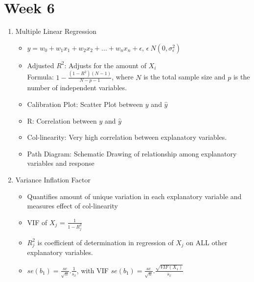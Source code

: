 \documentclass[a4paper]{article}
\begin{document}
 \section{Week 6}
 \begin{enumerate}
     \item Multiple Linear Regression
     \begin{itemize}
         \item $y = w_0 + w_1x_1 + w_2x_2 + ... + w_nx_n + \epsilon$, $\epsilon ~ N(0,\sigma_\epsilon^2)$
         \item Adjusted $R^2$: Adjusts for the amount of $X_i$\\
         Formula: $1 - \frac{(1 - R^2)(N - 1)}{N - p - 1}$, where $N$ is the total sample size and $p$ is the number of independent variables.
         \item Calibration Plot: Scatter Plot between $y$ and $\hat{y}$
         \item R: Correlation between $y$ and $\hat{y}$
         \item Col-linearity: Very high correlation between explanatory variables.
         \item Path Diagram: Schematic Drawing of relationship among explanatory variables and response
     \end{itemize}
     \item Variance Inflation Factor
     \begin{itemize}
         \item Quantifies amount of unique variation in each explanatory variable and measures effect of col-linearity
         \item VIF of $X_j$ = $\frac{1}{1-R_j^2}$
         \item $R_j^2$ is coefficient of determination in regression of $X_j$ on ALL other explanatory variables.
         \item $se(b_1) = \frac{se}{\sqrt{n}}.\frac{1}{s_x}$, with VIF $se(b_1) = \frac{se}{\sqrt{n}}.\frac{\sqrt{VIF(X_1)}}{s_x}$
     \end{itemize}
 \end{enumerate}
\end{document}
